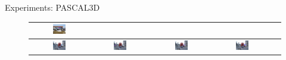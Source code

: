 \documentclass[serif,mathserif,final]{beamer}
\newcommand{\1}{\mathbb{I}} %
\begin{document}
\begin{frame}{}
\begin{columns}[t]
\begin{column}{0.39\linewidth}
\begin{block}{Experiments: PASCAL3D}
\begin{figure}
\begin{tabular}{|c|c|c|c|c|}
          \includegraphics[width=0.24\textwidth]{car_cnn/2e.png}  \\  
          \hline
          \includegraphics[width=0.24\textwidth]{car_cnn/4a.png} &   
          \includegraphics[width=0.24\textwidth]{car_cnn/4b.png} &   
          \includegraphics[width=0.24\textwidth]{car_cnn/4c.png} &   
          \includegraphics[width=0.24\textwidth]{car_cnn/4d.png}  \\  

\end{tabular}
\end{figure}
\end{block}
\end{column}
\end{columns}
\end{frame}
\end{document}
